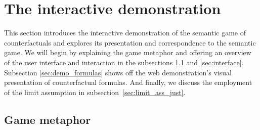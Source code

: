 \documentclass[a4paper,american,10pt]{paper}
\theoremstyle{definition}\newtheorem{definition}{Definition}
\begin{document}
\section{The interactive demonstration}\label{sec:demo}
This section introduces the interactive demonstration of the semantic game of counter\-factuals and explores its presentation and correspondence to the semantic game. We will begin by explaining the game metaphor and offering an overview of the user interface and interaction in the subsections \ref{sec:metaphor} and \ref{sec:interface}. Subsection \ref{sec:demo_formulas} shows off the web demonstration's visual presentation of counterfactual formulas. And finally, we discuss the employment of the limit assumption in subsection~\ref{sec:limit_ass_just}.
\subsection{Game metaphor}\label{sec:metaphor}
\end{document}
